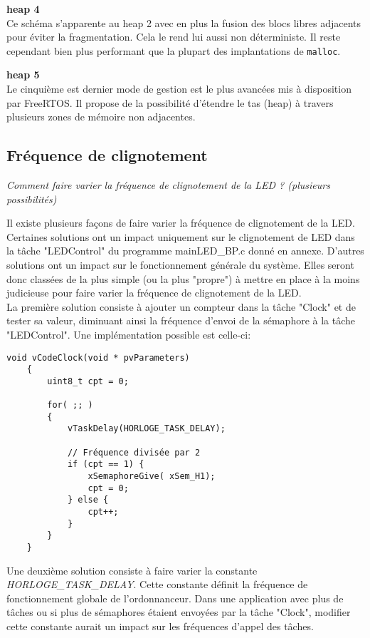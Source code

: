 \noindent
\textbf{heap 4} \\
Ce schéma s'apparente au heap 2 avec en plus la fusion des blocs libres adjacents pour éviter la fragmentation.
Cela le rend lui aussi non déterministe.
Il reste cependant bien plus performant que la plupart des implantations de \texttt{malloc}.

\noindent
\textbf{heap 5} \\
Le cinquième est dernier mode de gestion est le plus avancées mis à disposition par FreeRTOS.
Il propose de la possibilité d'étendre le tas (heap) à travers plusieurs zones de mémoire non adjacentes.


\subsection{Fréquence de clignotement}

\textit{Comment faire varier la fréquence de clignotement de la LED ? (plusieurs possibilités)}
\gap

Il existe plusieurs façons de faire varier la fréquence de clignotement de la LED.
Certaines solutions ont un impact uniquement sur le clignotement de LED dans la tâche "LEDControl" du programme mainLED\_BP.c donné en annexe.
D'autres solutions ont un impact sur le fonctionnement générale du système.
Elles seront donc classées de la plus simple (ou la plus "propre") à mettre en place à la moins judicieuse pour faire varier la fréquence de clignotement de la LED. \\
La première solution consiste à ajouter un compteur dans la tâche "Clock" et de tester sa valeur, diminuant ainsi la fréquence d'envoi de la sémaphore à la tâche "LEDControl".
Une implémentation possible est celle-ci:

\begin{lstlisting}[style=CStyle]
    void vCodeClock(void * pvParameters)
    {
        uint8_t cpt = 0;

        for( ;; )
        {
            vTaskDelay(HORLOGE_TASK_DELAY);
            
            // Fréquence divisée par 2
            if (cpt == 1) {
                xSemaphoreGive( xSem_H1);
                cpt = 0;
            } else {
                cpt++;
            }
        }
    }
\end{lstlisting}

Une deuxième solution consiste à faire varier la constante \textit{HORLOGE\_TASK\_DELAY}.
Cette constante définit la fréquence de fonctionnement globale de l'ordonnanceur.
Dans une application avec plus de tâches ou si plus de sémaphores étaient envoyées par la tâche "Clock", modifier cette constante aurait un impact sur les fréquences d'appel des tâches.

